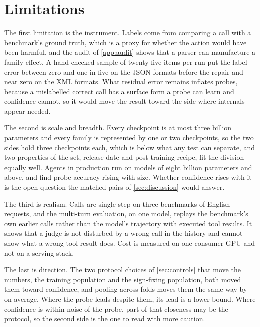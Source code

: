 \section{Limitations}
\label{sec:limitations}

The first limitation is the instrument. Labels come from comparing a call with a benchmark's ground truth, which is a proxy for whether the action would have been harmful, and the audit of \cref{app:audit} shows that a parser can manufacture a family effect. A hand-checked sample of twenty-five items per run put the label error between zero and one in five on the JSON formats before the repair and near zero on the XML formats. What residual error remains inflates probes, because a mislabelled correct call has a surface form a probe can learn and confidence cannot, so it would move the result toward the side where internals appear needed.

The second is scale and breadth. Every checkpoint is at most three billion parameters and every family is represented by one or two checkpoints, so the two sides hold three checkpoints each, which is below what any test can separate, and two properties of the set, release date and post-training recipe, fit the division equally well. Agents in production run on models of eight billion parameters and above, and \citet{yeats2026calls} find probe accuracy rising with size. Whether confidence rises with it is the open question the matched pairs of \cref{sec:discussion} would answer.

The third is realism. Calls are single-step on three benchmarks of English requests, and the multi-turn evaluation, on one model, replays the benchmark's own earlier calls rather than the model's trajectory with executed tool results. It shows that a judge is not disturbed by a wrong call in the history and cannot show what a wrong tool result does. Cost is measured on one consumer GPU and not on a serving stack.

The last is direction. The two protocol choices of \cref{sec:controls} that move the numbers, the training population and the sign-fixing population, both moved them toward confidence, and pooling across folds moves them the same way by \poolShiftMean{} on average. Where the probe leads despite them, its lead is a lower bound. Where confidence is within noise of the probe, part of that closeness may be the protocol, so the second side is the one to read with more caution.
